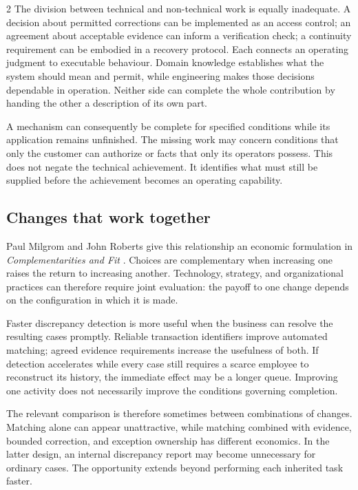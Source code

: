\begin{multicols}{2}
The division between technical and non-technical work is equally
inadequate. A decision about permitted corrections can be implemented as
an access control; an agreement about acceptable evidence can inform a
verification check; a continuity requirement can be embodied in a
recovery protocol. Each connects an operating judgment to executable
behaviour. Domain knowledge establishes what the system should mean and
permit, while engineering makes those decisions dependable in operation.
Neither side can complete the whole contribution by handing the other a
description of its own part.

A mechanism can consequently be complete for specified conditions while
its application remains unfinished. The missing work may concern
conditions that only the customer can authorize or facts that only its
operators possess. This does not negate the technical achievement. It
identifies what must still be supplied before the achievement becomes an
operating capability.

\subsection{Changes that work
together}\label{changes-that-work-together}

Paul Milgrom and John Roberts give this relationship an economic
formulation in \emph{Complementarities and Fit}
\citep{milgrom1995complementarities}. Choices are complementary when
increasing one raises the return to increasing another. Technology,
strategy, and organizational practices can therefore require joint
evaluation: the payoff to one change depends on the configuration in
which it is made.

Faster discrepancy detection is more useful when the business can
resolve the resulting cases promptly. Reliable transaction identifiers
improve automated matching; agreed evidence requirements increase the
usefulness of both. If detection accelerates while every case still
requires a scarce employee to reconstruct its history, the immediate
effect may be a longer queue. Improving one activity does not
necessarily improve the conditions governing completion.

The relevant comparison is therefore sometimes between combinations of
changes. Matching alone can appear unattractive, while matching combined
with evidence, bounded correction, and exception ownership has different
economics. In the latter design, an internal discrepancy report may
become unnecessary for ordinary cases. The opportunity extends beyond
performing each inherited task faster.


\end{multicols}
